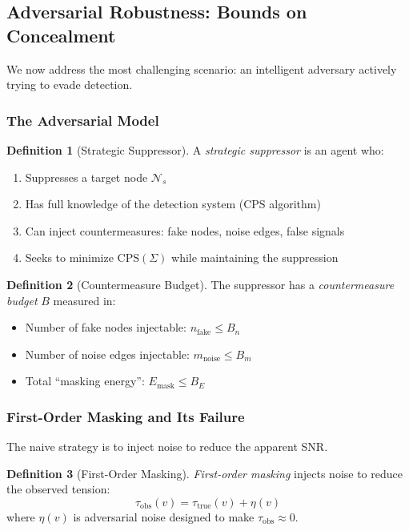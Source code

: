 \documentclass[12pt,a4paper]{article}
\theoremstyle{definition}
\newtheorem{definition}{Definition}[section]
\theoremstyle{remark}
\newcommand{\NS}{\mathcal{N}_s}          %
\begin{document}
\subsection{Adversarial Robustness: Bounds on Concealment}

We now address the most challenging scenario: an intelligent adversary actively trying to evade detection.

\subsubsection{The Adversarial Model}

\begin{definition}[Strategic Suppressor]
A \emph{strategic suppressor} is an agent who:
\begin{enumerate}
    \item Suppresses a target node $\NS$
    \item Has full knowledge of the detection system (CPS algorithm)
    \item Can inject countermeasures: fake nodes, noise edges, false signals
    \item Seeks to minimize $\text{CPS}(\Sigma)$ while maintaining the suppression
\end{enumerate}
\end{definition}

\begin{definition}[Countermeasure Budget]
The suppressor has a \emph{countermeasure budget} $B$ measured in:
\begin{itemize}
    \item Number of fake nodes injectable: $n_{\text{fake}} \leq B_n$
    \item Number of noise edges injectable: $m_{\text{noise}} \leq B_m$
    \item Total ``masking energy'': $E_{\text{mask}} \leq B_E$
\end{itemize}
\end{definition}

\subsubsection{First-Order Masking and Its Failure}

The naive strategy is to inject noise to reduce the apparent SNR.

\begin{definition}[First-Order Masking]
\emph{First-order masking} injects noise to reduce the observed tension:
\begin{equation}
    \tau_{\text{obs}}(v) = \tau_{\text{true}}(v) + \eta(v)
\end{equation}
where $\eta(v)$ is adversarial noise designed to make $\tau_{\text{obs}} \approx 0$.
\end{definition}
\end{document}
